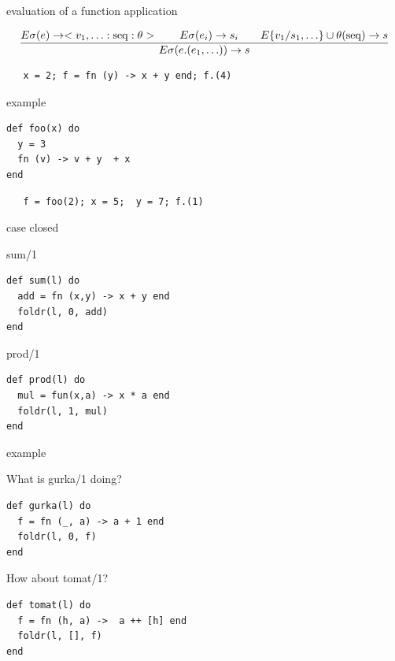 \begin{frame}[fragile]{evaluation of a function application}

$$\frac{E\sigma(e) \rightarrow <v_1, \ldots:{\rm seq}:\theta > \qquad E\sigma(e_i) \rightarrow s_i \qquad E\{v_1/s_1, \ldots\}\cup\theta({\rm seq}) \rightarrow s}{
E\sigma(e.(e_1, \ldots)) \rightarrow s}$$ 

\vspace{20pt}\pause
\begin{verbatim}
   x = 2; f = fn (y) -> x + y end; f.(4)
\end{verbatim}

\end{frame}
 
\begin{frame}[fragile]{example}

\begin{verbatim}
def foo(x) do
  y = 3
  fn (v) -> v + y  + x 
end
\end{verbatim}
\pause\vspace{20pt}

\begin{verbatim}
   f = foo(2); x = 5;  y = 7; f.(1)
\end{verbatim}
\end{frame}

\begin{frame}[fragile]{case closed}

\pause
     \begin{block}{sum/1}
       \begin{verbatim}
def sum(l) do
  add = fn (x,y) -> x + y end
  foldr(l, 0, add)
end
       \end{verbatim}
     \end{block}
   \pause
     \begin{block}{prod/1}
       \begin{verbatim}
def prod(l) do
  mul = fun(x,a) -> x * a end
  foldr(l, 1, mul)
end
       \end{verbatim}
\vfill
     \end{block}

\end{frame}

\begin{frame}[fragile]{example}

\pause What is gurka/1 doing?

\pause\vspace{20pt}

\begin{verbatim}
def gurka(l) do
  f = fn (_, a) -> a + 1 end
  foldr(l, 0, f)
end
\end{verbatim}

\pause\vspace{20pt}
\pause How about tomat/1?

\pause\vspace{10pt}
\begin{verbatim}
def tomat(l) do 
  f = fn (h, a) ->  a ++ [h] end
  foldr(l, [], f)
end
\end{verbatim}
\end{frame}

